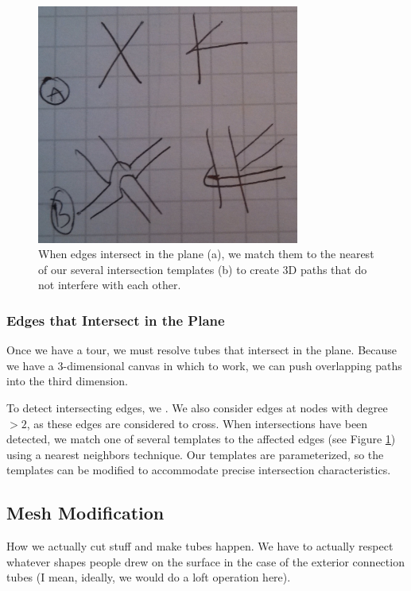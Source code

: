 \begin{figure}[h!]
\centering
    \includegraphics[width=3.4in]{figures/placeholder/templates.jpg}
\caption{When edges intersect in the plane (a), we match them to the nearest of our several intersection templates (b) to create 3D paths that do not interfere with each other.}
\label{fig:templates}
\end{figure}

\subsubsection{Edges that Intersect in the Plane}
Once we have a tour, we must resolve tubes that intersect in the plane.  Because we have a 3-dimensional canvas in which to work, we can push overlapping paths into the third dimension.

To detect intersecting edges, we .  We also consider edges at nodes with degree $>2$, as these edges are considered to cross.  When intersections have been detected, we match one of several templates to the affected edges (see Figure \ref{fig:templates}) using a nearest neighbors technique.  Our templates are parameterized, so the templates can be modified to accommodate precise intersection characteristics.


\subsection{Mesh Modification}

How we actually cut stuff and make tubes happen.   We have to actually respect whatever shapes people drew on the surface in the case of the exterior connection tubes (I mean, ideally, we would do a loft operation here).


